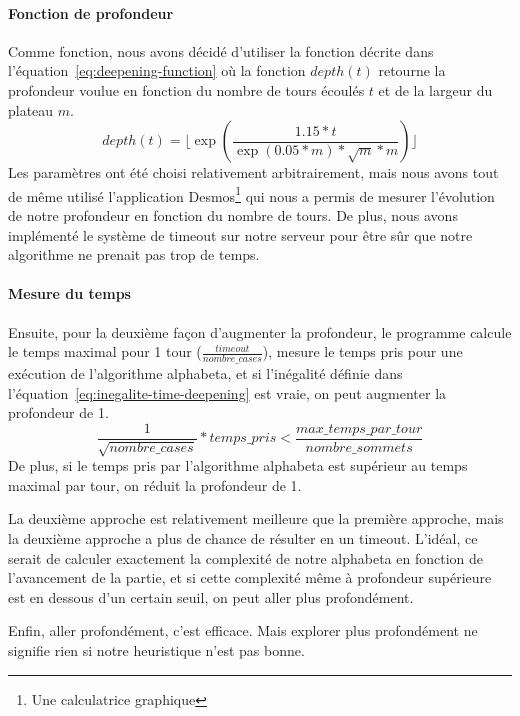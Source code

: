 \paragraph{Fonction de profondeur}
Comme fonction, nous avons décidé d'utiliser la fonction décrite dans l'équation~\ref{eq:deepening-function} où la fonction
$depth(t)$ retourne la profondeur voulue en fonction du nombre de tours écoulés $t$ et de la largeur du plateau $m$.
\begin{equation}
	depth(t) = \lfloor\exp\left(\frac{1.15*t}{\exp(0.05*m)*\sqrt{m}*m}\right)\rfloor
	\label{eq:deepening-function}
\end{equation}
Les paramètres ont été choisi relativement arbitrairement, mais nous avons tout de même
utilisé l'application Desmos\footnote{Une calculatrice graphique} qui nous a permis de mesurer
l'évolution de notre profondeur en fonction du nombre de tours. De plus, nous avons implémenté
le système de timeout sur notre serveur pour être sûr que notre algorithme ne prenait pas trop de temps.

\paragraph{Mesure du temps}
Ensuite, pour la deuxième façon d'augmenter la profondeur, le programme calcule
le temps maximal pour 1 tour ($\frac{timeout}{nombre\_cases}$),
mesure le temps pris pour une exécution de l'algorithme alphabeta, et
si l'inégalité définie dans l'équation~\ref{eq:inegalite-time-deepening} est vraie,
on peut augmenter la profondeur de 1.
\begin{equation}
	\frac{1}{\sqrt{nombre\_cases}}*temps\_pris < \frac{max\_temps\_par\_tour}{nombre\_sommets}
	\label{eq:inegalite-time-deepening}
\end{equation}
De plus, si le temps pris par l'algorithme alphabeta est supérieur au temps maximal par tour,
on réduit la profondeur de 1.

La deuxième approche est relativement meilleure que la première approche, mais la deuxième approche a plus
de chance de résulter en un timeout. L'idéal, ce serait de calculer exactement la complexité de notre alphabeta en fonction
de l'avancement de la partie, et si cette complexité même à profondeur supérieure est en dessous d'un certain seuil, on peut
aller plus profondément.

Enfin, aller profondément, c'est efficace. Mais explorer plus profondément
ne signifie rien si notre heuristique n'est pas bonne.

